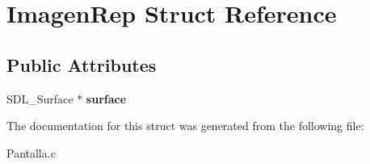 \hypertarget{struct_imagen_rep}{}\section{Imagen\+Rep Struct Reference}
\label{struct_imagen_rep}
\subsection*{Public Attributes}
\begin{DoxyCompactItemize}
\item 
\mbox{\label{struct_imagen_rep_a79a49c614b36759e76181569e02d49ed}} 
S\+D\+L\+\_\+\+Surface $\ast$ {\bfseries surface}
\end{DoxyCompactItemize}


The documentation for this struct was generated from the following file\+:\begin{DoxyCompactItemize}
\item 
Pantalla.\+c\end{DoxyCompactItemize}
